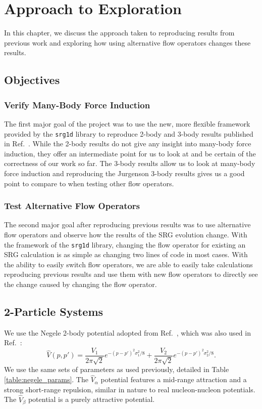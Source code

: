\chapter{Approach to Exploration}\label{methods}

In this chapter, we discuss the approach taken to reproducing results from previous work and exploring how using alternative flow operators changes these results.

\section{Objectives}

\subsection{Verify Many-Body Force Induction}

The first major goal of the project was to use the new, more flexible framework provided by the \texttt{srg1d} library to reproduce 2-body and 3-body results published in Ref.~\cite{Jurgenson:2008jp}. While the 2-body results do not give any insight into many-body force induction, they offer an intermediate point for us to look at and be certain of the correctness of our work so far. The 3-body results allow us to look at many-body force induction and reproducing the Jurgenson 3-body results gives us a good point to compare to when testing other flow operators.

\subsection{Test Alternative Flow Operators}

The second major goal after reproducing previous results was to use alternative flow operators and observe how the results of the SRG evolution change. With the framework of the \texttt{srg1d} library, changing the flow operator for existing an SRG calculation is as simple as changing two lines of code in most cases. With the ability to easily switch flow operators, we are able to easily take calculations reproducing previous results and use them with new flow operators to directly see the change caused by changing the flow operator.

\section{2-Particle Systems}

We use the Negele 2-body potential adopted from Ref.~\cite{Alexandrou:1988jg}, which was also used in Ref.~\cite{Jurgenson:2008jp}:
\begin{equation}\label{eq:negele}
\hat{V}(p, p') = \frac{V_1}{2\pi\sqrt2}e^{-(p-p')^2\sigma_1^2/8} + \frac{V_2}{2\pi\sqrt2}e^{-(p-p')^2\sigma_2^2/8}.
\end{equation}
We use the same sets of parameters as used previously, detailed in Table \ref{table:negele_params}. The $\hat{V}_\alpha$ potential features a mid-range attraction and a strong short-range repulsion, similar in nature to real nucleon-nucleon potentials. The $\hat{V}_\beta$ potential is a purely attractive potential.

